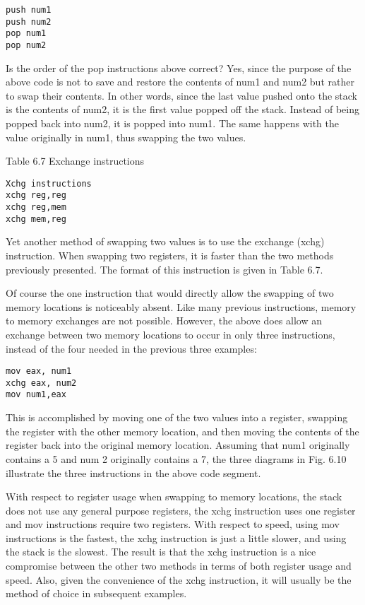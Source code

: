 \documentclass[10pt]{article}
\begin{document}
\begin{verbatim}
push num1
push num2
pop num1
pop num2
\end{verbatim}

Is the order of the pop instructions above correct? Yes, since the purpose of the above code is not to save and restore the contents of num1 and num2 but rather to swap their contents. In other words, since the last value pushed onto the stack is the contents of num2, it is the first value popped off the stack. Instead of being popped back into num2, it is popped into num1. The same happens with the value originally in num1, thus swapping the two values.

Table 6.7 Exchange instructions

\begin{verbatim}
Xchg instructions
xchg reg,reg
xchg reg,mem
xchg mem,reg
\end{verbatim}

Yet another method of swapping two values is to use the exchange (xchg) instruction. When swapping two registers, it is faster than the two methods previously presented. The format of this instruction is given in Table 6.7.

Of course the one instruction that would directly allow the swapping of two memory locations is noticeably absent. Like many previous instructions, memory to memory exchanges are not possible. However, the above does allow an exchange between two memory locations to occur in only three instructions, instead of the four needed in the previous three examples:

\begin{verbatim}
mov eax, num1
xchg eax, num2
mov num1,eax
\end{verbatim}

This is accomplished by moving one of the two values into a register, swapping the register with the other memory location, and then moving the contents of the register back into the original memory location. Assuming that num1 originally contains a 5 and num 2 originally contains a 7, the three diagrams in Fig. 6.10 illustrate the three instructions in the above code segment.

With respect to register usage when swapping to memory locations, the stack does not use any general purpose registers, the xchg instruction uses one register and mov instructions require two registers. With respect to speed, using mov instructions is the fastest, the xchg instruction is just a little slower, and using the stack is the slowest. The result is that the xchg instruction is a nice compromise between the other two methods in terms of both register usage and speed. Also, given the convenience of the xchg instruction, it will usually be the method of choice in subsequent examples.
\end{document}
